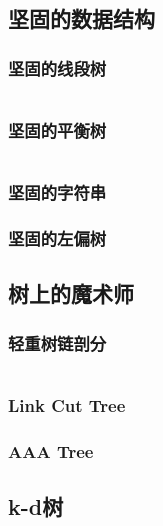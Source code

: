 \documentclass[a4paper]{article}
\newcommand{\cppcode}[1]{
    \inputminted[mathescape]{cpp}{source/#1}
}
\begin{document}
\cppcode{data-structure/splay.cpp}

\subsection{坚固的数据结构}

\subsubsection{坚固的线段树}

\cppcode{data-structure/persistent-segment-tree.cpp}

\subsubsection{坚固的平衡树}

\cppcode{data-structure/persistent-treap.cpp}

\subsubsection{坚固的字符串}

\subsubsection{坚固的左偏树}

\subsection{树上的魔术师}

\subsubsection{轻重树链剖分}

\cppcode{data-structure/heavy-light-decomposition.cpp}

\subsubsection{Link Cut Tree}

\subsubsection{AAA Tree}

\subsection{k-d树}
\end{document}
